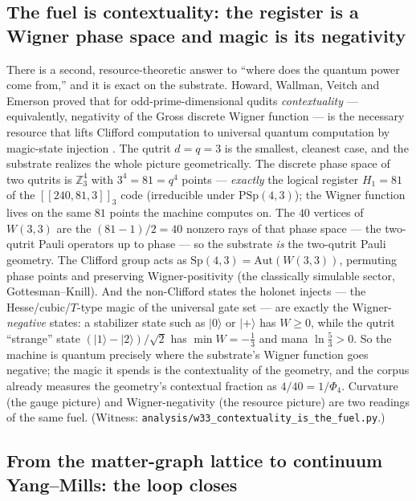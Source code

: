 \documentclass[11pt]{article}
\begin{document}
\subsection{The fuel is contextuality: the register is a Wigner phase space and
magic is its negativity}
\label{sec:contextuality-fuel}

There is a second, resource-theoretic answer to ``where does the quantum power
come from,'' and it is exact on the substrate. Howard, Wallman, Veitch and
Emerson proved that for odd-prime-dimensional qudits \emph{contextuality} ---
equivalently, negativity of the Gross discrete Wigner function --- is the
necessary resource that lifts Clifford computation to universal quantum
computation by magic-state injection \cite{howard14}. The qutrit $d=q=3$ is the
smallest, cleanest case, and the substrate realizes the whole picture
geometrically. The discrete phase space of two qutrits is $\mathbb Z_3^{4}$ with
$3^4=81=q^4$ points --- \emph{exactly} the logical register $H_1=81$ of the
$[[240,81,3]]_3$ code (irreducible under $\mathrm{PSp}(4,3)$); the Wigner function
lives on the same $81$ points the machine computes on. The $40$ vertices of
$W(3,3)$ are the $(81-1)/2=40$ nonzero rays of that phase space --- the two-qutrit
Pauli operators up to phase --- so the substrate \emph{is} the two-qutrit Pauli
geometry. The Clifford group acts as $\mathrm{Sp}(4,3)=\mathrm{Aut}(W(3,3))$,
permuting phase points and preserving Wigner-positivity (the classically simulable
sector, Gottesman--Knill). And the non-Clifford states the holonet injects ---
the Hesse/cubic/$T$-type magic of the universal gate set --- are exactly the
Wigner-\emph{negative} states: a stabilizer state such as $\lvert0\rangle$ or
$\lvert+\rangle$ has $W\ge0$, while the qutrit ``strange'' state
$(\lvert1\rangle-\lvert2\rangle)/\sqrt2$ has $\min W=-\tfrac13$ and mana
$\ln\tfrac53>0$. So the machine is quantum precisely where the substrate's Wigner
function goes negative; the magic it spends is the contextuality of the geometry,
and the corpus already measures the geometry's contextual fraction as
$4/40=1/\Phi_4$. Curvature (the gauge picture) and Wigner-negativity (the
resource picture) are two readings of the same fuel. (Witness:
\texttt{analysis/w33\_contextuality\_is\_the\_fuel.py}.)

\subsection{From the matter-graph lattice to continuum Yang--Mills: the loop
closes}
\label{sec:lattice-to-continuum}
\end{document}
